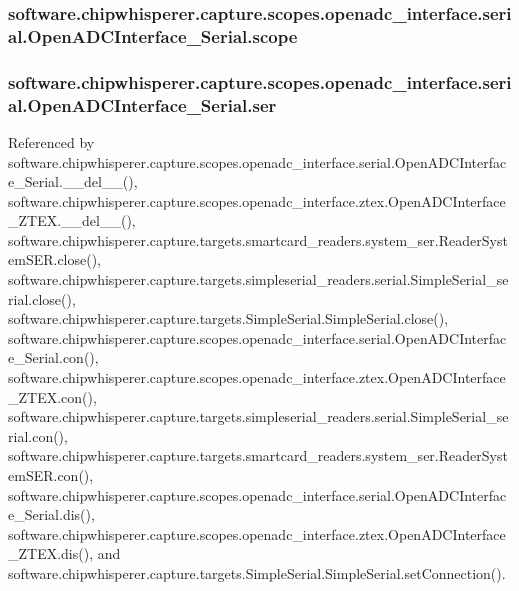 \subsubsection[{scope}]{\setlength{\rightskip}{0pt plus 5cm}software.\+chipwhisperer.\+capture.\+scopes.\+openadc\+\_\+interface.\+serial.\+Open\+A\+D\+C\+Interface\+\_\+\+Serial.\+scope}\label{classsoftware_1_1chipwhisperer_1_1capture_1_1scopes_1_1openadc__interface_1_1serial_1_1OpenADCInterface__Serial_aa5eed3d2850db93835fc543b227f7901}
\hypertarget{classsoftware_1_1chipwhisperer_1_1capture_1_1scopes_1_1openadc__interface_1_1serial_1_1OpenADCInterface__Serial_a2929eb39f0b9bd82649ba87de5c3551d}{}
\subsubsection[{ser}]{\setlength{\rightskip}{0pt plus 5cm}software.\+chipwhisperer.\+capture.\+scopes.\+openadc\+\_\+interface.\+serial.\+Open\+A\+D\+C\+Interface\+\_\+\+Serial.\+ser}\label{classsoftware_1_1chipwhisperer_1_1capture_1_1scopes_1_1openadc__interface_1_1serial_1_1OpenADCInterface__Serial_a2929eb39f0b9bd82649ba87de5c3551d}


Referenced by software.\+chipwhisperer.\+capture.\+scopes.\+openadc\+\_\+interface.\+serial.\+Open\+A\+D\+C\+Interface\+\_\+\+Serial.\+\_\+\+\_\+del\+\_\+\+\_\+(), software.\+chipwhisperer.\+capture.\+scopes.\+openadc\+\_\+interface.\+ztex.\+Open\+A\+D\+C\+Interface\+\_\+\+Z\+T\+E\+X.\+\_\+\+\_\+del\+\_\+\+\_\+(), software.\+chipwhisperer.\+capture.\+targets.\+smartcard\+\_\+readers.\+system\+\_\+ser.\+Reader\+System\+S\+E\+R.\+close(), software.\+chipwhisperer.\+capture.\+targets.\+simpleserial\+\_\+readers.\+serial.\+Simple\+Serial\+\_\+serial.\+close(), software.\+chipwhisperer.\+capture.\+targets.\+Simple\+Serial.\+Simple\+Serial.\+close(), software.\+chipwhisperer.\+capture.\+scopes.\+openadc\+\_\+interface.\+serial.\+Open\+A\+D\+C\+Interface\+\_\+\+Serial.\+con(), software.\+chipwhisperer.\+capture.\+scopes.\+openadc\+\_\+interface.\+ztex.\+Open\+A\+D\+C\+Interface\+\_\+\+Z\+T\+E\+X.\+con(), software.\+chipwhisperer.\+capture.\+targets.\+simpleserial\+\_\+readers.\+serial.\+Simple\+Serial\+\_\+serial.\+con(), software.\+chipwhisperer.\+capture.\+targets.\+smartcard\+\_\+readers.\+system\+\_\+ser.\+Reader\+System\+S\+E\+R.\+con(), software.\+chipwhisperer.\+capture.\+scopes.\+openadc\+\_\+interface.\+serial.\+Open\+A\+D\+C\+Interface\+\_\+\+Serial.\+dis(), software.\+chipwhisperer.\+capture.\+scopes.\+openadc\+\_\+interface.\+ztex.\+Open\+A\+D\+C\+Interface\+\_\+\+Z\+T\+E\+X.\+dis(), and software.\+chipwhisperer.\+capture.\+targets.\+Simple\+Serial.\+Simple\+Serial.\+set\+Connection().



